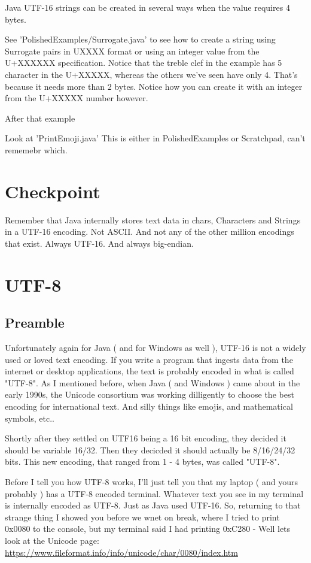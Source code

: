 \documentclass[12pt]{article}
\begin{document}
Java UTF-16 strings can be created in several ways when the value requires 4 bytes.

See 'PolishedExamples/Surrogate.java' to see how to create a string using Surrogate pairs in UXXXX format or using an integer value from the U+XXXXXX specification. Notice that the treble clef in the example has 5 character in the U+XXXXX, whereas the others we've seen have only 4. That's because it needs more than 2 bytes. Notice how you can create it with an integer from the U+XXXXX number however.

After that example

Look at 'PrintEmoji.java' This is either in PolishedExamples or Scratchpad, can't rememebr which.

\section{ Checkpoint }
Remember that Java internally stores text data in chars, Characters and Strings in a UTF-16 encoding. Not ASCII. And not any of the other million encodings that exist. Always UTF-16. And always big-endian.

\section{UTF-8}
\subsection{Preamble}
Unfortunately again for Java ( and for Windows as well ), UTF-16 is not a widely used or loved text encoding. If you write a program that ingests data from the internet or desktop applications, the text is probably encoded in what is called "UTF-8". As I  mentioned before, when Java ( and Windows ) came about in the early 1990s, the Unicode consortium was working dilligently to choose the best encoding for international text. And silly things like emojis, and mathematical symbols, etc..

Shortly after they settled on UTF16 being a 16 bit encoding, they decided it should be variable 16/32. Then they decicded it should actually be 8/16/24/32 bits. This new encoding, that ranged from 1 - 4 bytes, was called "UTF-8". 

Before I tell you how UTF-8 works, I'll just tell  you that my laptop ( and yours probably ) has a UTF-8 encoded terminal. Whatever text you see in my terminal is internally encoded as UTF-8. Just as Java used UTF-16. So, returning to that strange thing I showed you before we wnet on break, where I tried to print 0x0080 to the console, but my terminal said I had printing 0xC280 - Well lets look at the Unicode page:
\url{https://www.fileformat.info/info/unicode/char/0080/index.htm}
\end{document}
